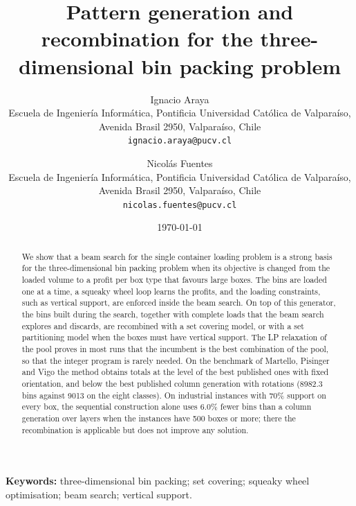 \documentclass[10pt]{article}
\title{Pattern generation and recombination for the three-dimensional bin packing problem}
\author{Ignacio Araya\\[2pt]
\small Escuela de Ingenier\'ia Inform\'atica, Pontificia Universidad Cat\'olica de Valpara\'iso,\\
\small Avenida Brasil 2950, Valpara\'iso, Chile\\
\small \texttt{ignacio.araya@pucv.cl}
\and
Nicol\'as Fuentes\\[2pt]
\small Escuela de Ingenier\'ia Inform\'atica, Pontificia Universidad Cat\'olica de Valpara\'iso,\\
\small Avenida Brasil 2950, Valpara\'iso, Chile\\
\small \texttt{nicolas.fuentes@pucv.cl}}
\date{\today}
\begin{document}
\maketitle

\begin{abstract}
We show that a beam search for the single container loading problem is a strong basis for the
three-dimensional bin packing problem when its objective is changed from the loaded volume to a profit per
box type that favours large boxes. The bins are loaded one at a time, a squeaky wheel loop learns the profits,
and the loading constraints, such as vertical support, are enforced inside the beam search. On top of this
generator, the bins built during the search, together with complete loads that the beam search explores and
discards, are recombined with a set covering model, or with a set partitioning model when the boxes must have
vertical support. The LP relaxation of the pool proves in most runs that the incumbent is the best
combination of the pool, so that the integer program is rarely needed. On the benchmark of Martello,
Pisinger and Vigo the method obtains totals at the level of the best published ones with fixed
orientation, and below the best published column generation with rotations (8982.3 bins against 9013
on the eight classes). On industrial instances with 70\% support on every box, the sequential construction alone uses 6.0\%
fewer bins than a column generation over layers when the instances have 500 boxes or more; there the
recombination is applicable but does not improve any solution.
\end{abstract}

\noindent\textbf{Keywords:} three-dimensional bin packing; set covering; squeaky wheel optimisation;
beam search; vertical support.

\begingroup
\renewcommand{\contentsname}{Pending items (remove before submission)}
\endgroup
\clearpage







\appendix





\end{document}
